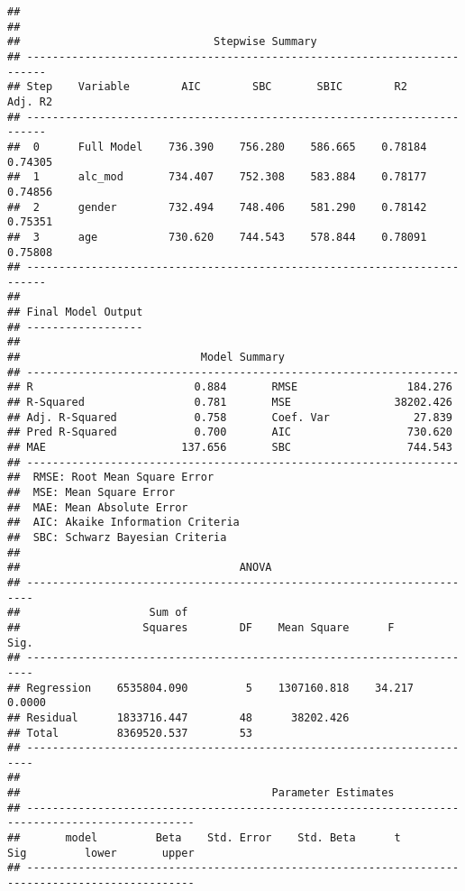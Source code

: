 \documentclass[
]{article}
\begin{document}
\begin{verbatim}
## 
## 
##                              Stepwise Summary                              
## -------------------------------------------------------------------------
## Step    Variable        AIC        SBC       SBIC        R2       Adj. R2 
## -------------------------------------------------------------------------
##  0      Full Model    736.390    756.280    586.665    0.78184    0.74305 
##  1      alc_mod       734.407    752.308    583.884    0.78177    0.74856 
##  2      gender        732.494    748.406    581.290    0.78142    0.75351 
##  3      age           730.620    744.543    578.844    0.78091    0.75808 
## -------------------------------------------------------------------------
## 
## Final Model Output 
## ------------------
## 
##                            Model Summary                            
## -------------------------------------------------------------------
## R                         0.884       RMSE                 184.276 
## R-Squared                 0.781       MSE                38202.426 
## Adj. R-Squared            0.758       Coef. Var             27.839 
## Pred R-Squared            0.700       AIC                  730.620 
## MAE                     137.656       SBC                  744.543 
## -------------------------------------------------------------------
##  RMSE: Root Mean Square Error 
##  MSE: Mean Square Error 
##  MAE: Mean Absolute Error 
##  AIC: Akaike Information Criteria 
##  SBC: Schwarz Bayesian Criteria 
## 
##                                  ANOVA                                  
## -----------------------------------------------------------------------
##                    Sum of                                              
##                   Squares        DF    Mean Square      F         Sig. 
## -----------------------------------------------------------------------
## Regression    6535804.090         5    1307160.818    34.217    0.0000 
## Residual      1833716.447        48      38202.426                     
## Total         8369520.537        53                                    
## -----------------------------------------------------------------------
## 
##                                       Parameter Estimates                                        
## ------------------------------------------------------------------------------------------------
##       model         Beta    Std. Error    Std. Beta      t        Sig         lower       upper 
## ------------------------------------------------------------------------------------------------

\end{verbatim}
\end{document}
